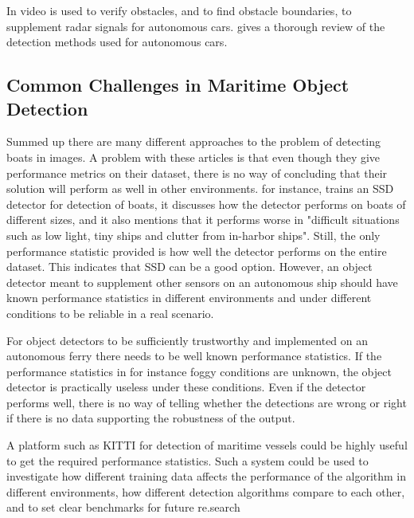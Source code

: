 \vspace{3mm}

In \citep{Wedel2007} video is used to verify obstacles, and to find obstacle boundaries, to supplement radar signals for autonomous cars. \citep{Sun2006} gives a thorough review of the detection methods used for autonomous cars. 


\subsection{Common Challenges in Maritime Object Detection}
Summed up there are many different approaches to the problem of detecting boats in images. A problem with these articles is that even though they give performance metrics on their dataset, there is no way of concluding that their solution will perform as well in other environments. \citep{SSD_detection2018} for instance, trains an SSD detector for detection of boats, it discusses how the detector performs on boats of different sizes, and it also mentions that it performs worse in "difficult situations such as low light, tiny ships and clutter from in-harbor ships". Still, the only performance statistic provided is how well the detector performs on the entire dataset. This indicates that SSD can be a good option. However, an object detector meant to supplement other sensors on an autonomous ship should have known performance statistics in different environments and under different conditions to be reliable in a real scenario. 

\vspace{3mm}

For object detectors to be sufficiently trustworthy and implemented on an autonomous ferry there needs to be well known performance statistics. If the performance statistics in for instance foggy conditions are unknown, the object detector is practically useless under these conditions. Even if the detector performs well, there is no way of telling whether the detections are wrong or right if there is no data supporting the robustness of the output.

\vspace{3mm}

A platform such as KITTI \citep{KITTI} for detection of maritime vessels could be highly useful to get the required performance statistics. Such a system could be used to investigate how different training data affects the performance of the algorithm in different environments, how different detection algorithms compare to each other, and to set clear benchmarks for future re.search



\cleardoublepage